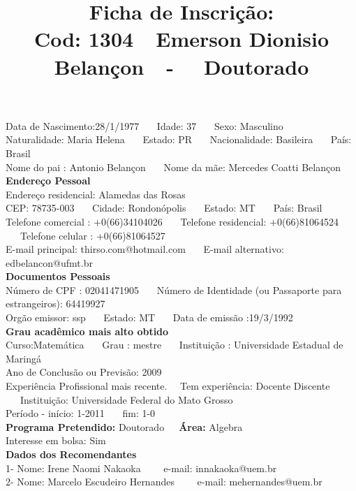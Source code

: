 \documentclass[11pt]{article}
\title{\vspace*{-4cm} Ficha de Inscrição: \\Cod: 1304\ \ Emerson Dionisio Belançon\ \ - \ \ Doutorado 
 }
\date{}
\begin{document}
\maketitle
\vspace*{-1.5cm}
\noindent Data de Nascimento:28/1/1977
\ \ \ Idade: 37   \ \ \ Sexo: Masculino
\\
Naturalidade: Maria Helena  
\ \ \  Estado: PR
\ \ \  Nacionalidade: Basileira
\ \ \ País: Brasil
\\        
Nome do pai : Antonio Belançon
\ \ \ Nome da mãe: Mercedes Coatti Belançon          
\\[0.2cm]                     
\textbf{Endereço Pessoal} 
\\ 
\noindent Endereço residencial: Alamedas das Rosas
\\
        CEP: 78735-003 
\ \ \ Cidade: Rondonópolis 
\ \ \ Estado: MT 
\ \ \ País: Brasil
\\		
		Telefone comercial : +0(66)34104026
\ \ \ Telefone residencial: +0(66)81064524
\ \ \ Telefone celular : +0(66)81064527
\\
E-mail principal: thirso.com@hotmail.com
\ \ \ E-mail alternativo: edbelancon@ufmt.br 
\\[0.2cm] 
\textbf{Documentos Pessoais}
\\
\noindent Número de CPF : 02041471905
\ \ \ Número de Identidade (ou Passaporte para estrangeiros): 64419927
\\
Orgão emissor: ssp
\ \ \ Estado: MT
\ \ \ Data de emissão :19/3/1992
\\[0.3cm]
\textbf{Grau acadêmico mais alto obtido}
\\	
Curso:Matemática
\ \ \ Grau : mestre
\ \ \ Instituição : Universidade Estadual de Maringá
\\			
Ano de Conclusão ou Previsão: 2009
\\ 
Experiência Profissional mais recente. \ \  
Tem experiência: Docente Discente  
\ \ \ Instituição: Universidade Federal do Mato Grosso
\\  
Período - início: 1-2011
\ \ \ fim: 1-0
\\[0.2cm] 
\textbf{Programa Pretendido:} Doutorado\ \ \ \textbf{Área:} Algebra\\
Interesse em bolsa: Sim
\\[0.3cm]		
\textbf{Dados dos Recomendantes} 
\\
1- Nome: Irene Naomi Nakaoka
\ \ \ \  e-mail: innakaoka@uem.br 
\\
2- Nome: Marcelo Escudeiro Hernandes
\ \ \ \ e-mail: mehernandes@uem.br
\end{document}
